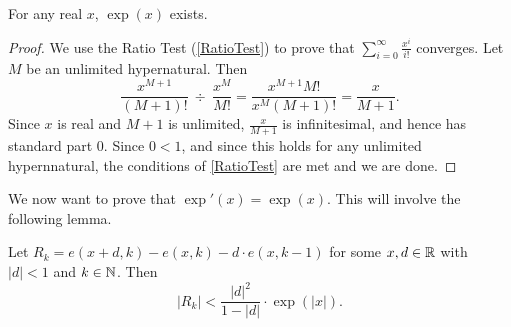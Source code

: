 \begin{thm}\label{expExists}
    For any real $x$, $\exp(x)$ exists.
\end{thm}

\begin{proof}
    We use the Ratio Test (\autoref{RatioTest}) to prove that $\sum_{i=0}^\infty \frac{x^i}{i!}$ converges. Let $M$ be an unlimited hypernatural. Then 
    \[
        \frac{x^{M+1}}{(M+1)!} \  \div \  \frac{x^M}{M!} = \frac{x^{M+1}M!}{x^M (M+1)!} 
        = \frac{x}{M+1}.
    \]
    Since $x$ is real and $M+1$ is unlimited, $\frac{x}{M+1}$ is infinitesimal, and hence has standard part $0$. Since $0 < 1$, and since this holds for any unlimited hypernnatural, the conditions of \autoref{RatioTest} are met and we are done.
\end{proof}
We now want to prove that $\exp'(x) = \exp(x)$. This will involve the following lemma.

\begin{lemma}\label{expRemainderLemma}
    Let $R_k = e(x+d, k) - e(x, k) - d \cdot e(x, k-1)$ for some $x, d \in \mathbb{R}$ with $|d| < 1$ and $k \in \mathbb{N}$. Then
    \[ |R_k| < \frac{|d|^2}{1-|d|} \cdot \exp(|x|). \]
\end{lemma}

